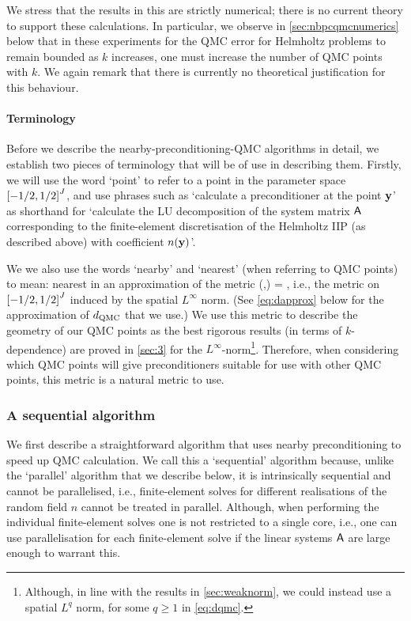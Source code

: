 We stress that the results in this  are strictly numerical; there is no current theory to support these calculations. In particular, we observe in \cref{sec:nbpcqmcnumerics} below that in these experiments for the QMC error for Helmholtz problems to remain bounded as $k$ increases, one must increase the number of QMC points with $k.$ We again remark that there is currently no theoretical justification for this behaviour.


\paragraph{Terminology} Before we describe the nearby-preconditioning-QMC algorithms in detail, we establish two pieces of terminology that will be of use in describing them. Firstly, we will use the word `point' to refer to a point in the parameter space $\cube{J}$, and use phrases such as `calculate a preconditioner at the point $\mathbf{y}$' as shorthand for `calculate the LU decomposition of the system matrix $\mathsf{A}$ corresponding to the finite-element discretisation of the Helmholtz IIP (as described above) with coefficient $n(\mathbf{y})$'.

We we also use the words `nearby' and `nearest' (when referring to QMC points) to mean: nearest in an approximation of the metric
\beq\label{eq:dqmc}
\dQMC(\byo,\byt) = ,
\eeq
i.e., the metric on $\cube{J}$ induced by the spatial $L^\infty$ norm. (See \cref{eq:dapprox} below for the approximation of $d_{\mathrm{QMC}}$ that we use.) We use this metric to describe the geometry of our QMC points as the best rigorous results (in terms of $k$-dependence) are proved in \cref{sec:3} for the $L^\infty$-norm\footnote{Although, in line with the results in \cref{sec:weaknorm}, we could instead use a spatial $L^q$ norm, for some $q \geq 1$ in \cref{eq:dqmc}.}. Therefore, when considering which QMC points will give preconditioners suitable for use with other QMC points, this metric is a natural metric to use.


\subsubsection{A sequential algorithm}
We first describe a straightforward algorithm that uses nearby preconditioning to speed up QMC calculation. We call this a `sequential' algorithm because, unlike the `parallel' algorithm that we describe below, it is intrinsically sequential and cannot be parallelised, i.e., finite-element solves for different realisations of the random field $n$ cannot be treated in parallel. Although, when performing the individual finite-element solves one is not restricted to a single core, i.e., one can use parallelisation for each finite-element solve  if the linear systems $\mathsf{A}$ are large enough to warrant this.

